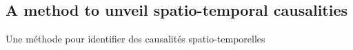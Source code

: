 




%






\subsection[Spatio-temporal Causalities][Causalités Spatio-temporelles]{A method to unveil spatio-temporal causalities}{Une méthode pour identifier des causalités spatio-temporelles}


